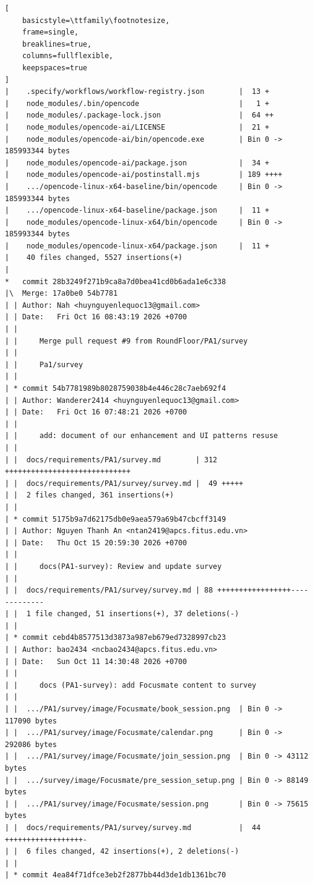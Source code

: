 \begin{lstlisting}[
    basicstyle=\ttfamily\footnotesize,
    frame=single,
    breaklines=true,
    columns=fullflexible,
    keepspaces=true
]
|    .specify/workflows/workflow-registry.json        |  13 +
|    node_modules/.bin/opencode                       |   1 +
|    node_modules/.package-lock.json                  |  64 ++
|    node_modules/opencode-ai/LICENSE                 |  21 +
|    node_modules/opencode-ai/bin/opencode.exe        | Bin 0 -> 185993344 bytes
|    node_modules/opencode-ai/package.json            |  34 +
|    node_modules/opencode-ai/postinstall.mjs         | 189 ++++
|    .../opencode-linux-x64-baseline/bin/opencode     | Bin 0 -> 185993344 bytes
|    .../opencode-linux-x64-baseline/package.json     |  11 +
|    node_modules/opencode-linux-x64/bin/opencode     | Bin 0 -> 185993344 bytes
|    node_modules/opencode-linux-x64/package.json     |  11 +
|    40 files changed, 5527 insertions(+)
|   
*   commit 28b3249f271b9ca8a7d0bea41cd0b6ada1e6c338
|\  Merge: 17a0be0 54b7781
| | Author: Nah <huynguyenlequoc13@gmail.com>
| | Date:   Fri Oct 16 08:43:19 2026 +0700
| | 
| |     Merge pull request #9 from RoundFloor/PA1/survey
| |     
| |     Pa1/survey
| | 
| * commit 54b7781989b8028759038b4e446c28c7aeb692f4
| | Author: Wanderer2414 <huynguyenlequoc13@gmail.com>
| | Date:   Fri Oct 16 07:48:21 2026 +0700
| | 
| |     add: document of our enhancement and UI patterns resuse
| | 
| |  docs/requirements/PA1/survey.md        | 312 +++++++++++++++++++++++++++++
| |  docs/requirements/PA1/survey/survey.md |  49 +++++
| |  2 files changed, 361 insertions(+)
| | 
| * commit 5175b9a7d62175db0e9aea579a69b47cbcff3149
| | Author: Nguyen Thanh An <ntan2419@apcs.fitus.edu.vn>
| | Date:   Thu Oct 15 20:59:30 2026 +0700
| | 
| |     docs(PA1-survey): Review and update survey
| | 
| |  docs/requirements/PA1/survey/survey.md | 88 +++++++++++++++++-------------
| |  1 file changed, 51 insertions(+), 37 deletions(-)
| | 
| * commit cebd4b8577513d3873a987eb679ed7328997cb23
| | Author: bao2434 <ncbao2434@apcs.fitus.edu.vn>
| | Date:   Sun Oct 11 14:30:48 2026 +0700
| | 
| |     docs (PA1-survey): add Focusmate content to survey
| | 
| |  .../PA1/survey/image/Focusmate/book_session.png  | Bin 0 -> 117090 bytes
| |  .../PA1/survey/image/Focusmate/calendar.png      | Bin 0 -> 292086 bytes
| |  .../PA1/survey/image/Focusmate/join_session.png  | Bin 0 -> 43112 bytes
| |  .../survey/image/Focusmate/pre_session_setup.png | Bin 0 -> 88149 bytes
| |  .../PA1/survey/image/Focusmate/session.png       | Bin 0 -> 75615 bytes
| |  docs/requirements/PA1/survey/survey.md           |  44 ++++++++++++++++++-
| |  6 files changed, 42 insertions(+), 2 deletions(-)
| | 
| * commit 4ea84f71dfce3eb2f2877bb44d3de1db1361bc70

\end{lstlisting}
